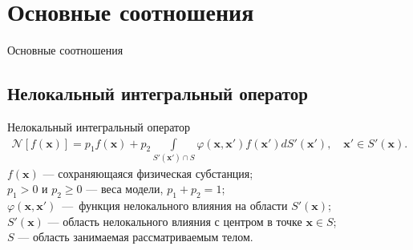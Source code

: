 \section{Основные соотношения}

\begin{frame}
	\centering
	\Huge
	Основные соотношения
\end{frame}

\subsection{Нелокальный интегральный оператор}
\begin{frame}{Нелокальный интегральный оператор}
	\begin{gather*}
		\mathcal{N} [f(\boldsymbol{x})] = 
		p_1 f(\boldsymbol{x}) + 
		p_2 \int\limits_{S'(\boldsymbol{x}') \cap S} 
			\varphi(\boldsymbol{x}, \boldsymbol{x}') f(\boldsymbol{x}')
		dS'(\boldsymbol{x}'),
		\quad
		\boldsymbol{x}' \in S'(\boldsymbol{x}).
	\end{gather*}
	$f(\boldsymbol{x})$ --- сохраняющаяся физическая субстанция; \\
	$p_1 > 0$ и $p_2 \geqslant 0$ --- веса модели, $p_1 + p_2 = 1$; \\
	$\varphi(\boldsymbol{x}, \boldsymbol{x}')$~---~функция нелокального влияния на области $S'(\boldsymbol{x})$; \\
	$S'(\boldsymbol{x})$ --- область нелокального влияния с центром в точке $\boldsymbol{x} \in S$;\\
	$S$ --- область занимаемая рассматриваемым телом.
	

\end{frame}
